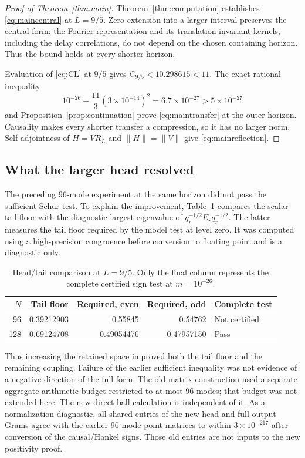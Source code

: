 \documentclass[11pt]{article}
\numberwithin{equation}{section}
\theoremstyle{definition}
\theoremstyle{remark}
\newcommand{\norm}[1]{\lVert#1\rVert}
\begin{document}
\begin{proof}[Proof of Theorem~\ref{thm:main}]
Theorem~\ref{thm:computation} establishes \eqref{eq:maincentral} at $L=9/5$.
Zero extension into a larger interval preserves the central form: the
Fourier representation and its translation-invariant kernels, including
the delay correlations, do not depend on the chosen containing horizon.
Thus the bound holds at every shorter horizon.

Evaluation of \eqref{eq:CL} at $9/5$ gives $C_{9/5}<10.298615<11$.
The exact rational inequality
\[
 10^{-26}-\frac{11}{3}(3\times10^{-14})^2
 =6.7\times10^{-27}>5\times10^{-27}
\]
and Proposition~\ref{prop:continuation} prove \eqref{eq:maintransfer}
at the outer horizon. Causality makes every shorter transfer a compression,
so it has no larger norm. Self-adjointness of $H=VR_L$ and
$\norm H=\norm V$ give \eqref{eq:mainreflection}.
\end{proof}

\subsection{What the larger head resolved}

The preceding 96-mode experiment at the same horizon did not pass the
sufficient Schur test. To explain the improvement, Table~\ref{tab:diagnostic}
compares the scalar tail floor with the diagnostic largest eigenvalue of
$q_r^{-1/2}E_rq_r^{-1/2}$. The latter measures the tail floor required by
the model test at level zero. It was computed using a high-precision
congruence before conversion to floating point and is a diagnostic only.

\begin{table}[ht]
\centering
\caption{Head/tail comparison at $L=9/5$. Only the final column represents
the complete certified sign test at $m=10^{-26}$.}
\label{tab:diagnostic}
\begin{tabular}{@{}rrrrl@{}}
\toprule
$N$ & Tail floor & Required, even & Required, odd & Complete test\\
\midrule
96 & 0.39212903 & 0.55845 & 0.54762 & Not certified\\
128 & 0.69124708 & 0.49054476 & 0.47957150 & Pass\\
\bottomrule
\end{tabular}
\end{table}

Thus increasing the retained space improved both the tail floor and the
remaining coupling. Failure of the earlier sufficient inequality was not
evidence of a negative direction of the full form. The old matrix construction
used a separate aggregate arithmetic budget restricted to at most 96 modes;
that budget was not extended here. The new direct-ball calculation is
independent of it. As a normalization diagnostic, all shared entries of the
new head and full-output Grams agree with the earlier 96-mode point matrices
to within $3\times10^{-217}$ after conversion of the causal/Hankel signs.
Those old entries are not inputs to the new positivity proof.
\end{document}
